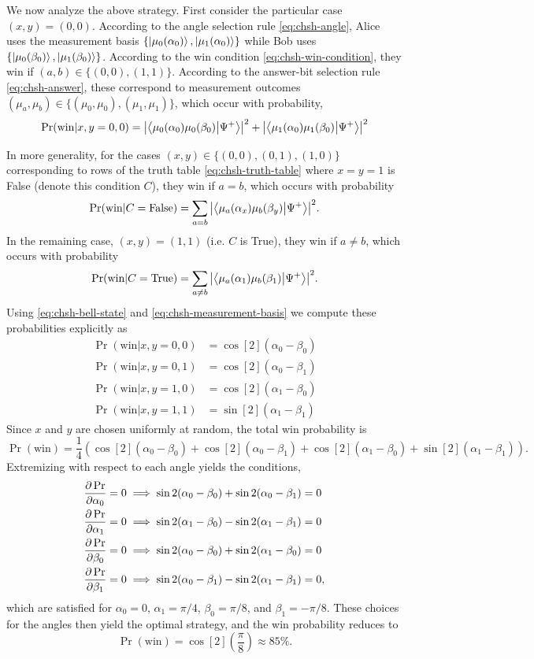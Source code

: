 \documentclass[12pt]{article}
\begin{document}
\begin{appendices}
We now analyze the above strategy. First consider the particular case $(x, y) = (0, 0)$. According to the angle selection rule \eqref{eq:chsh-angle}, Alice uses the measurement basis $\{\ket{\mu_0(\alpha_0)}, \ket{\mu_1(\alpha_0)}\}$ while Bob uses $\{\ket{\mu_0(\beta_0)}, \ket{\mu_1(\beta_0)}\}$. According to the win condition \eqref{eq:chsh-win-condition}, they win if $(a, b) \in \{(0, 0), (1,1)\}$. According to the answer-bit selection rule \eqref{eq:chsh-answer}, these correspond to measurement outcomes $(\mu_a, \mu_b) \in \{(\mu_0, \mu_0), (\mu_1, \mu_1)\}$, which occur with probability,
\[\Pr(\text{win}|x,y=0,0) =
\abs{\braket{\mu_0(\alpha_0)\mu_0(\beta_0)}{\Psi^+}}^2 +
\abs{\braket{\mu_1(\alpha_0)\mu_1(\beta_0)}{\Psi^+}}^2\]

In more generality, for the cases $(x, y) \in \{(0, 0), (0, 1), (1, 0)\}$ corresponding to rows of the truth table \eqref{eq:chsh-truth-table} where $x = y = 1$ is False (denote this condition $C$), they win if $a = b$, which occurs with probability
\[\Pr(\text{win}|C=\text{False}) = \sum_{a=b}
\abs{\braket{\mu_a(\alpha_x)\mu_b(\beta_y)}{\Psi^+}}^2.\]
In the remaining case, $(x, y) = (1, 1)$ (i.e. $C$ is True), they win if $a \neq b$, which occurs with probability
\[\Pr(\text{win}|C=\text{True}) = \sum_{a\neq b}
\abs{\braket{\mu_a(\alpha_1)\mu_b(\beta_1)}{\Psi^+}}^2.\]
Using \eqref{eq:chsh-bell-state} and \eqref{eq:chsh-measurement-basis} we compute these probabilities explicitly as
\begin{align}
\Pr(\text{win}|x,y=0,0) &= \cos[2](\alpha_0 - \beta_0) \\
\Pr(\text{win}|x,y=0,1) &= \cos[2](\alpha_0 - \beta_1) \\
\Pr(\text{win}|x,y=1,0) &= \cos[2](\alpha_1 - \beta_0) \\
\Pr(\text{win}|x,y=1,1) &= \sin[2](\alpha_1 - \beta_1)
\end{align}
Since $x$ and $y$ are chosen uniformly at random, the total win probability is
\begin{equation}
    \Pr(\text{win}) = \frac{1}{4}\left(
    \cos[2](\alpha_0 - \beta_0) +
    \cos[2](\alpha_0 - \beta_1) +
    \cos[2](\alpha_1 - \beta_0) +
    \sin[2](\alpha_1 - \beta_1)\right).
\end{equation}
Extremizing with respect to each angle yields the conditions,
\begin{align}
    \pdv{\Pr}{\alpha_0} = 0 &\implies \sin 2(\alpha_0 - \beta_0) + \sin 2(\alpha_0 - \beta_1) = 0 \\
    \pdv{\Pr}{\alpha_1} = 0 &\implies \sin 2(\alpha_1 - \beta_0) - \sin 2(\alpha_1 - \beta_1) = 0 \\
    \pdv{\Pr}{\beta_0} = 0 &\implies \sin 2(\alpha_0 - \beta_0) + \sin 2(\alpha_1 - \beta_0) = 0 \\
    \pdv{\Pr}{\beta_1} = 0 &\implies \sin 2(\alpha_0 - \beta_1) - \sin 2(\alpha_1 - \beta_1) = 0,
\end{align}
which are satisfied for $\alpha_0 = 0$, $\alpha_1 = \pi/4$, $\beta_0 = \pi/8$, and $\beta_1 = -\pi/8$. These choices for the angles then yield the optimal strategy, and the win probability reduces to
\[\Pr(\text{win}) = \cos[2](\frac{\pi}{8}) \approx 85\%.\]

\end{appendices}

\clearpage\newpage
\nocite{*}


\end{document}
